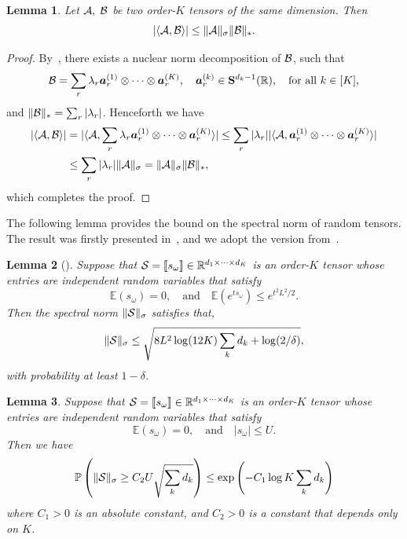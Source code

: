\documentclass[11pt]{article}
\theoremstyle{plain}
\newtheorem{lem}{Lemma}
\theoremstyle{definition}
\begin{document}
\begin{lem} \label{lem:inq}
Let $\mathcal{A}, \; \mathcal{B}$ be two order-$K$ tensors of the same dimension. Then
\[
|\langle \mathcal{A},\mathcal{B}\rangle| \leq \lVert\mathcal{A}\rVert_\sigma   \lVert\mathcal{B}\rVert_*.
\]
\end{lem}

\begin{proof}
By~\citet[Proposition 3.1]{friedland2018nuclear}, there exists a nuclear norm decomposition of $\mathcal{B}$, such that
\[
\mathcal{B}=\sum_{r} \lambda_r \bm{a}^{(1)}_r\otimes \cdots\otimes \bm{a}^{(K)}_r,\quad \bm{a}_r^{(k)}\in\mathbf{S}^{d_k-1}(\mathbb{R}),\quad \text{for all }k\in[K],
\]
and $\lVert\mathcal{B}\rVert_*=\sum_{r}|\lambda_r|$. Henceforth we have
\begin{align*}
|\langle \mathcal{A},\mathcal{B}\rangle|&=| \langle \mathcal{A}, \sum_{r} \lambda_r \bm{a}^{(1)}_r\otimes \cdots\otimes \bm{a}^{(K)}_r \rangle|\leq \sum_r |\lambda_r| |\langle \mathcal{A}, \bm{a}^{(1)}_r \otimes \cdots\otimes \bm{a}^{(K)}_r \rangle|\\
&\leq \sum_{r}|\lambda_r| \lVert\mathcal{A}\rVert_\sigma= \lVert\mathcal{A}\rVert_\sigma\lVert\mathcal{B}\rVert_*,
\end{align*}
which completes the proof.
\end{proof}


The following lemma provides the bound on the spectral norm of random tensors. The result was firstly presented in~\cite{nguyen2015tensor}, and we adopt the version from~\cite{tomioka2014spectral}.
\begin{lem}[\cite{tomioka2014spectral}]\label{lem:tensor}
Suppose that $\mathcal{S}=\llbracket s_{\omega} \rrbracket\in\mathbb{R}^{d_1\times \cdots \times d_K}$ is an order-$K$ tensor whose entries are independent random variables that satisfy
\[
\mathbb{E}(s_{\omega})=0,\quad \text{and} \quad\mathbb{E}(e^{ts_{\omega}})\leq e^{t^2L^2/2}.
\]
Then the spectral norm $\lVert\mathcal{S}\rVert_\sigma$ satisfies that,
\[
\lVert\mathcal{S}\rVert_\sigma\leq \sqrt{{8L^2} \log (12K) \sum_k d_k +\log (2/\delta)},
\]
with probability at least $1-\delta$.
\end{lem}



\begin{lem} \label{lem:noisytensor}
Suppose that $\mathcal{S}=\llbracket s_{\omega} \rrbracket\in\mathbb{R}^{d_1\times \cdots \times d_K}$ is an order-$K$ tensor whose entries are independent random variables that satisfy
\[
\mathbb{E}(s_{\omega})=0,\quad \text{and}\quad |s_{\omega}|\leq U.
\]
Then we have
\[
\mathbb{P}\left(\lVert\mathcal{S}\rVert_\sigma\geq C_2 U\sqrt{\sum_k d_k} \right)\leq \exp\left(-C_1  \log K \sum_k d_k\right)
\]
where $C_1>0$ is an absolute constant, and $C_2>0$ is a constant that depends only on $K$.
\end{lem}
\end{document}
